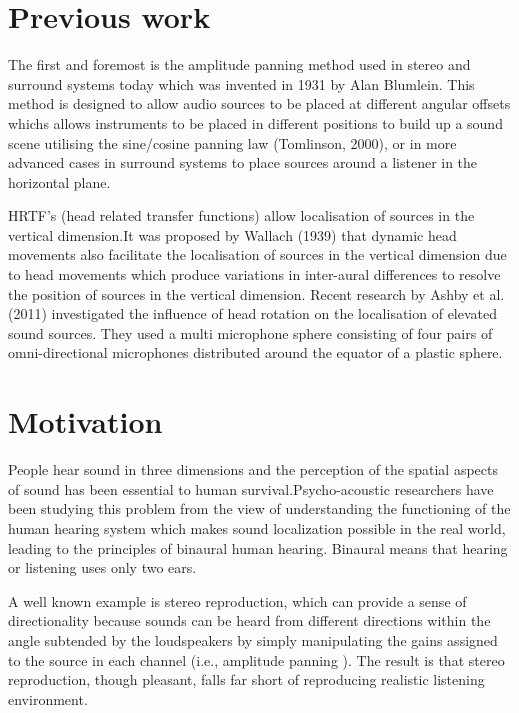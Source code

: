 \documentclass[BTech]{nitkdiss}
\begin{document}
\section{Previous work}
The first and foremost is the amplitude panning method used
in stereo and surround systems today which was invented in 1931 by Alan Blumlein. This method is designed to allow audio sources to be placed at different angular offsets whichs allows instruments to be placed in different positions to build up a sound scene utilising the sine/cosine panning law (Tomlinson, 2000), or in more advanced cases in surround systems to place sources around a listener in the horizontal plane.

HRTF’s (head related transfer functions) allow
localisation of sources in the vertical dimension.It was proposed by Wallach (1939) that dynamic head movements also facilitate the localisation of sources in the vertical dimension due to head movements which produce variations in inter-aural differences to resolve the position of sources in the vertical dimension.
Recent research by Ashby et al. (2011) investigated the influence of head rotation on the localisation of elevated sound sources. They used a multi microphone sphere consisting of four pairs of omni-directional microphones distributed around the equator of a plastic sphere.


\section{Motivation}
People hear sound in three dimensions and the perception of the spatial aspects of sound has been essential to human survival.Psycho-acoustic researchers have been studying this problem from the view of understanding the functioning of the human hearing system which makes sound
localization possible in the real world, leading to the principles of binaural human hearing. Binaural means that hearing or listening uses only two ears. 

A well known example is stereo reproduction, which can provide a sense of
directionality because sounds can be heard from different directions within the angle subtended by the loudspeakers by simply manipulating the gains assigned to the source in each channel (i.e., amplitude panning ). The result is that stereo reproduction, though pleasant, falls far short of reproducing realistic listening environment. 
\end{document}
